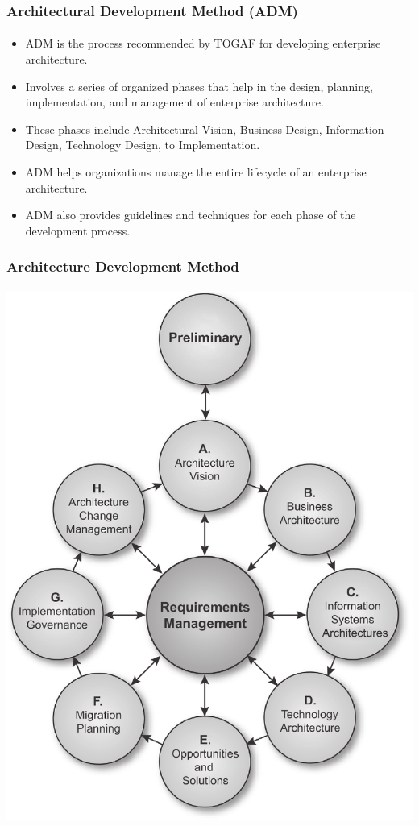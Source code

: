 \documentclass[aspectratio=169, table]{beamer}
\begin{document}
    \begin{frame}
        \frametitle{Architectural Development Method (ADM)}
        \framesubtitle{\hspace{1cm}}
        \vspace{20pt}
        \begin{itemize}
            \item ADM is the process recommended by TOGAF for developing enterprise architecture.
            \item Involves a series of organized phases that help in the design, planning, implementation, and management of enterprise architecture.
            \item These phases include Architectural Vision, Business Design, Information Design, Technology Design, to Implementation.
            \item ADM helps organizations manage the entire lifecycle of an enterprise architecture.
            \item ADM also provides guidelines and techniques for each phase of the development process.
        \end{itemize}
    \end{frame}

    {
        \begin{frame}
            \frametitle{Architecture Development Method}
            \framesubtitle{\hspace{1cm}}
            \begin{center}
                \includegraphics[width=.43\textwidth]{../figures/architecture_development_method}
            \end{center}
        \end{frame}
    }
\end{document}
